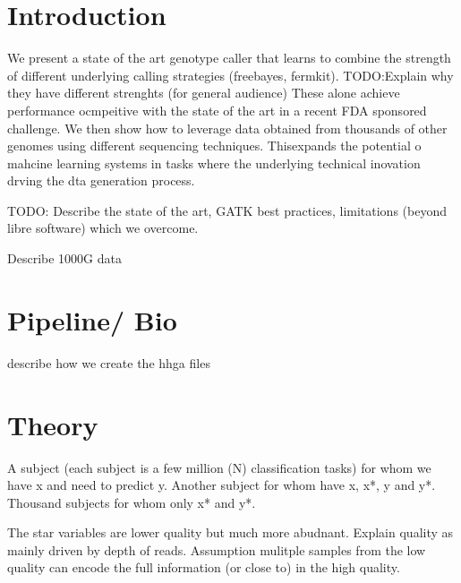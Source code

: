\documentclass[11pt, a4paper]{article}
\title{} %
\author{NDP,EG, PD?}
\date{\today}
\begin{document}
\maketitle




\section{Introduction}

We present a state of the art genotype caller that learns to combine the strength of different underlying calling strategies (freebayes, fermkit).
TODO:Explain why they have different strenghts (for general audience) 
These alone achieve performance ocmpeitive with the state of the art in a recent FDA sponsored challenge.
We then show how to leverage data obtained from thousands of other genomes using different sequencing techniques. 
Thisexpands the potential o mahcine learning systems in tasks where the underlying technical inovation drving the dta generation process. 

TODO: Describe the state of the art, GATK best practices, limitations (beyond libre software) which we overcome.


Describe 1000G data  

\section{Pipeline/ Bio}

describe how we create the hhga files

\section{Theory}

A subject (each subject is  a few million (N) classification tasks) for whom we have  x and  need to predict y.
Another subject for whom have x,  x*,  y and  y*.
Thousand subjects for whom only x* and y*.

The star variables are lower quality but much more abudnant.
Explain quality as mainly driven by depth of reads. %
Assumption mulitple samples from the low quality can encode the full information (or close to) in the high quality.
\end{document}
